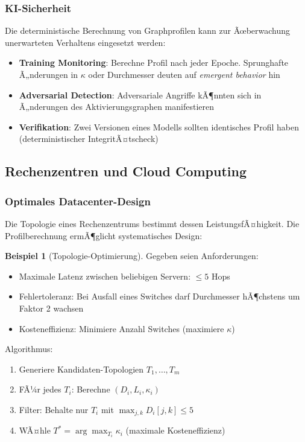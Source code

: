 ﻿\documentclass[a4paper,12pt]{article}
\theoremstyle{definition}
\newtheorem{beispiel}{Beispiel}
\begin{document}
	\subsubsection{KI-Sicherheit}
	
	Die deterministische Berechnung von Graphprofilen kann zur Ãœberwachung unerwarteten Verhaltens eingesetzt werden:
	
	\begin{itemize}
		\item[-] \textbf{Training Monitoring}: Berechne Profil nach jeder Epoche. Sprunghafte Ã„nderungen in $\kappa$ oder Durchmesser deuten auf \textit{emergent behavior} hin
		\item[-] \textbf{Adversarial Detection}: Adversariale Angriffe kÃ¶nnten sich in Ã„nderungen des Aktivierungsgraphen manifestieren
		\item[-] \textbf{Verifikation}: Zwei Versionen eines Modells sollten identisches Profil haben (deterministischer IntegritÃ¤tscheck)
	\end{itemize}
	
	\subsection{Rechenzentren und Cloud Computing}
	
	\subsubsection{Optimales Datacenter-Design}
	
	Die Topologie eines Rechenzentrums bestimmt dessen LeistungsfÃ¤higkeit. Die Profilberechnung ermÃ¶glicht systematisches Design:
	
	\begin{beispiel}[Topologie-Optimierung]
		Gegeben seien Anforderungen:
		\begin{itemize}
			\item[-] Maximale Latenz zwischen beliebigen Servern: $\leq 5$ Hops
			\item[-] Fehlertoleranz: Bei Ausfall eines Switches darf Durchmesser hÃ¶chstens um Faktor 2 wachsen
			\item[-] Kosteneffizienz: Minimiere Anzahl Switches (maximiere $\kappa$)
		\end{itemize}
		
		Algorithmus:
		\begin{enumerate}
			\item Generiere Kandidaten-Topologien $T_1, \ldots, T_m$
			\item FÃ¼r jedes $T_i$: Berechne $(D_i, L_i, \kappa_i)$
			\item Filter: Behalte nur $T_i$ mit $\max_{j,k} D_i[j,k] \leq 5$
			\item WÃ¤hle $T^* = \arg\max_{T_i} \kappa_i$ (maximale Kosteneffizienz)
		\end{enumerate}
	\end{beispiel}
	
\end{document}
